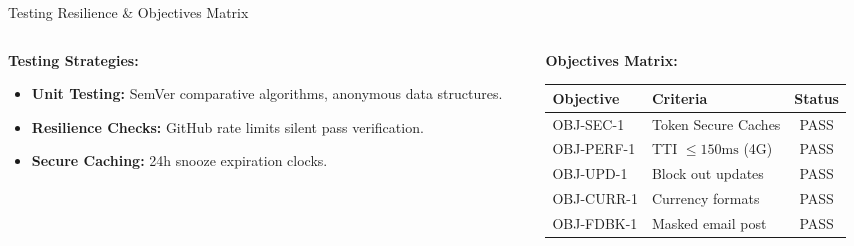 \documentclass[10pt]{beamer}
\begin{document}
\begin{frame}{Testing Resilience \& Objectives Matrix}
    \begin{columns}
        \begin{column}{0.5\textwidth}
            \textbf{Testing Strategies:}
            \begin{itemize}
                \item \textbf{Unit Testing:} SemVer comparative algorithms, anonymous data structures.
                \item \textbf{Resilience Checks:} GitHub rate limits silent pass verification.
                \item \textbf{Secure Caching:} 24h snooze expiration clocks.
            \end{itemize}
        \end{column}
        \begin{column}{0.5\textwidth}
            \textbf{Objectives Matrix:}
            \begin{table}[htbp]
                \tiny
                \begin{tabular}{llc}
                    \toprule
                    \textbf{Objective} & \textbf{Criteria} & \textbf{Status} \\
                    \midrule
                    OBJ-SEC-1 & Token Secure Caches & PASS \\
                    OBJ-PERF-1 & TTI $\le 150\text{ms}$ (4G) & PASS \\
                    OBJ-UPD-1 & Block out updates & PASS \\
                    OBJ-CURR-1 & Currency formats & PASS \\
                    OBJ-FDBK-1 & Masked email post & PASS \\
                    \bottomrule
                \end{tabular}
            \end{table}
        \end{column}
    \end{columns}
\end{frame}
\end{document}
